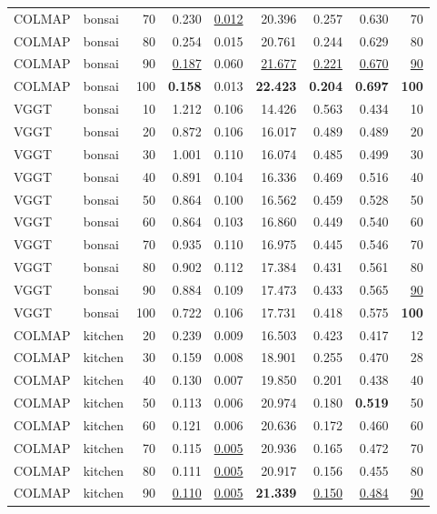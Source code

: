 \begin{table}[H]
\begin{tabular}{llrrrrrrr}
COLMAP & bonsai & 70 & 0.230 & \underline{0.012} & 20.396 & 0.257 & 0.630 & 70 \\
COLMAP & bonsai & 80 & 0.254 & 0.015 & 20.761 & 0.244 & 0.629 & 80 \\
COLMAP & bonsai & 90 & \underline{0.187} & 0.060 & \underline{21.677} & \underline{0.221} & \underline{0.670} & \underline{90} \\
COLMAP & bonsai & 100 & \textbf{0.158} & 0.013 & \textbf{22.423} & \textbf{0.204} & \textbf{0.697} & \textbf{100} \\
VGGT & bonsai & 10 & 1.212 & 0.106 & 14.426 & 0.563 & 0.434 & 10 \\
VGGT & bonsai & 20 & 0.872 & 0.106 & 16.017 & 0.489 & 0.489 & 20 \\
VGGT & bonsai & 30 & 1.001 & 0.110 & 16.074 & 0.485 & 0.499 & 30 \\
VGGT & bonsai & 40 & 0.891 & 0.104 & 16.336 & 0.469 & 0.516 & 40 \\
VGGT & bonsai & 50 & 0.864 & 0.100 & 16.562 & 0.459 & 0.528 & 50 \\
VGGT & bonsai & 60 & 0.864 & 0.103 & 16.860 & 0.449 & 0.540 & 60 \\
VGGT & bonsai & 70 & 0.935 & 0.110 & 16.975 & 0.445 & 0.546 & 70 \\
VGGT & bonsai & 80 & 0.902 & 0.112 & 17.384 & 0.431 & 0.561 & 80 \\
VGGT & bonsai & 90 & 0.884 & 0.109 & 17.473 & 0.433 & 0.565 & \underline{90} \\
VGGT & bonsai & 100 & 0.722 & 0.106 & 17.731 & 0.418 & 0.575 & \textbf{100} \\
\midrule
COLMAP & kitchen & 20 & 0.239 & 0.009 & 16.503 & 0.423 & 0.417 & 12 \\
COLMAP & kitchen & 30 & 0.159 & 0.008 & 18.901 & 0.255 & 0.470 & 28 \\
COLMAP & kitchen & 40 & 0.130 & 0.007 & 19.850 & 0.201 & 0.438 & 40 \\
COLMAP & kitchen & 50 & 0.113 & 0.006 & 20.974 & 0.180 & \textbf{0.519} & 50 \\
COLMAP & kitchen & 60 & 0.121 & 0.006 & 20.636 & 0.172 & 0.460 & 60 \\
COLMAP & kitchen & 70 & 0.115 & \underline{0.005} & 20.936 & 0.165 & 0.472 & 70 \\
COLMAP & kitchen & 80 & 0.111 & \underline{0.005} & 20.917 & 0.156 & 0.455 & 80 \\
COLMAP & kitchen & 90 & \underline{0.110} & \underline{0.005} & \textbf{21.339} & \underline{0.150} & \underline{0.484} & \underline{90} \\

\end{tabular}
\end{table}
